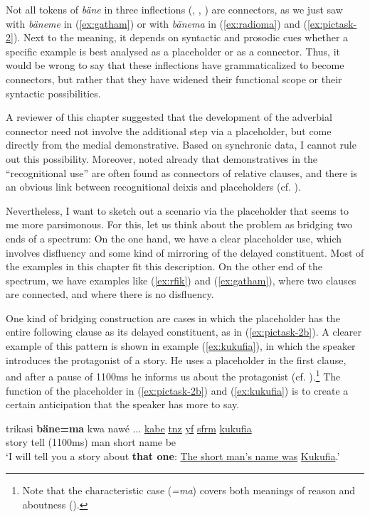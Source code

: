 \documentclass[output=paper,colorlinks,citecolor=brown]{langscibook}
\begin{document}
Not all tokens of \textit{bäne} in three inflections (, , ) are connectors, as we just saw with \textit{bäneme} in (\ref{ex:gatham}) or with \textit{bänema} in (\ref{ex:radioma}) and (\ref{ex:pictask-2}). Next to the meaning, it depends on syntactic and prosodic cues whether a specific example is best analysed as a placeholder or as a connector. Thus, it would be wrong to say that these inflections have grammaticalized to become connectors, but rather that they have widened their functional scope or their syntactic possibilities.

A reviewer of this chapter suggested that the development of the adverbial connector need not involve the additional step via a placeholder, but come directly from the medial demonstrative. Based on synchronic data, I cannot rule out this possibility. Moreover, \textcite[230]{Himmelmann:2014zj} noted already that demonstratives in the ``recognitional use'' are often found as connectors of relative clauses, and there is an obvious link between recognitional deixis and placeholders (cf. \cite{Enfield:2003rf}).

Nevertheless, I want to sketch out a scenario via the placeholder that seems to me more parsimonous. For this, let us think about the problem as bridging two ends of a spectrum: On the one hand, we have a clear placeholder use, which involves disfluency and some kind of mirroring of the delayed constituent. Most of the examples in this chapter fit this description. On the other end of the spectrum, we have examples like (\ref{ex:rfik}) and (\ref{ex:gatham}), where two clauses are connected, and where there is no disfluency.

\largerpage[1.5]
One kind of bridging construction are cases in which the placeholder has the entire following clause as its delayed constituent, as in (\ref{ex:pictask-2b}). A clearer example of this pattern is shown in example (\ref{ex:kukufia}), in which the speaker introduces the protagonist of a story. He uses a placeholder in the first clause, and after a pause of 1100ms he informs us about the protagonist (cf. ).\footnote{Note that the characteristic case (\textit{=ma}) covers both meanings of reason and aboutness (\cite[157]{Dohler:2018qt}).} The function of the placeholder in (\ref{ex:pictask-2b}) and (\ref{ex:kukufia}) is to create a certain anticipation that the speaker has more to say.

\ea \label{ex:kukufia}
    \gll trikasi \textbf{bäne=ma} kwa nawé ... \uline{kabe} \uline{tnz} \uline{yf} \uline{sfrm} \uline{kukufia}\\
    story   tell (1100ms) man short name be \\
    \glt `I will tell you a story about \textbf{that one}: \uline{The short man's name was} \uline{Kukufia}.' 
\z
\end{document}
